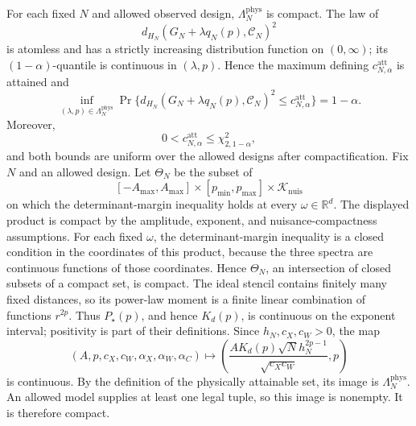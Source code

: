 For each fixed \(N\) and allowed observed design, \(\Lambda_N^{\mathrm{phys}}\) is compact.  The law of
\[
d_{H_N}(G_N+\lambda q_N(p),\mathcal C_N)^2
\]
is atomless and has a strictly increasing distribution function on \((0,\infty)\); its \((1-\alpha)\)-quantile is continuous in \((\lambda,p)\).  Hence the maximum defining \(c_{N,\alpha}^{\mathrm{att}}\) is attained and
\[
 \inf_{(\lambda,p)\in\Lambda_N^{\mathrm{phys}}}
 \Pr\{d_{H_N}(G_N+\lambda q_N(p),\mathcal C_N)^2
       \le c_{N,\alpha}^{\mathrm{att}}\}=1-\alpha.                           \tag{20}
\]
Moreover,
\[
 0<c_{N,\alpha}^{\mathrm{att}}\le\chi^2_{2,1-\alpha},                       \tag{21}
\]
and both bounds are uniform over the allowed designs after compactification.
Fix \(N\) and an allowed design.  Let \(\Theta_N\) be the subset of
\[
[-A_{\max},A_{\max}]\times[p_{\min},p_{\max}]
   \times\mathcal K_{\mathrm{nuis}}
\]
on which the determinant-margin inequality holds at every \(\omega\in\mathbb R^d\).  The displayed product is compact by the amplitude, exponent, and nuisance-compactness assumptions.  For each fixed \(\omega\), the determinant-margin inequality is a closed condition in the coordinates of this product, because the three spectra are continuous functions of those coordinates.  Hence \(\Theta_N\), an intersection of closed subsets of a compact set, is compact.  The ideal stencil contains finitely many fixed distances, so its power-law moment is a finite linear combination of functions \(r^{2p}\).  Thus \(P_\star(p)\), and hence \(K_d(p)\), is continuous on the exponent interval; positivity is part of their definitions.  Since \(h_N,c_X,c_W>0\), the map
\[
(A,p,c_X,c_W,\alpha_X,\alpha_W,\alpha_C)
 \longmapsto
 \left(\frac{A K_d(p)\sqrt N h_N^{2p-1}}{\sqrt{c_Xc_W}},p\right)             \tag{22}
\]
is continuous.  By the definition of the physically attainable set, its image is \(\Lambda_N^{\mathrm{phys}}\).  An allowed model supplies at least one legal tuple, so this image is nonempty.  It is therefore compact.

